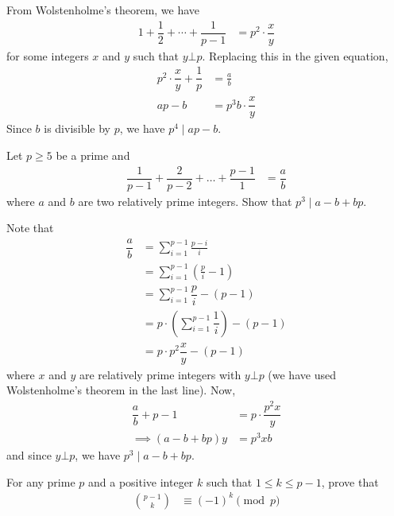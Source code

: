 \documentclass[12pt]{subfile}
\begin{document}
		\begin{solution}
			From Wolstenholme's theorem, we have
				\begin{align*}
					1 + \dfrac{1}{2} + \cdots + \dfrac{1}{p-1}
						& = p^2 \cdot \dfrac{x}{y}
				\end{align*}
			for some integers $x$ and $y$ such that $y \bot p$. Replacing this in the given equation,
				\begin{align*}
					p^2 \cdot \dfrac{x}{y}+ \dfrac{1}{p}
						& = \frac{a}{b}\\
					ap-b
						& = p^3b \cdot \dfrac{x}{y}
				\end{align*}
			Since $b$ is divisible by $p$, we have $p^4\mid ap-b$.
		\end{solution}

		\begin{problem}
			Let $p \geq 5$ be a prime and
				\begin{align*}
					\dfrac{1}{p-1} + \dfrac{2}{p-2} + \ldots + \dfrac{p-1}{1}
						& =\dfrac{a}{b}
				\end{align*}
			where $a$ and $b$ are two relatively prime integers. Show that $p^3\mid a-b+bp$.
		\end{problem}

		\begin{solution}
			Note that
				\begin{align*}
					\dfrac{a}{b}
						& = \sum_{i=1}^{p-1} \frac{p-i}{i}\\
						& =\sum_{i=1}^{p-1} \left(\frac{p}{i} -1 \right)\\
						& =\sum_{i=1}^{p-1} \dfrac{p}{i} - (p-1)\\
						& = p\cdot\left(\sum_{i=1}^{p-1} \dfrac{1}{i}\right)-(p-1)\\
						& = p \cdot p^2 \dfrac{x}{y}-(p-1)
				\end{align*}
			where $x$ and $y$ are relatively prime integers with $y \bot p$ (we have used Wolstenholme's theorem in the last line). Now,
				\begin{align*}
					\dfrac a b+p-1
						& =p\cdot\dfrac{p^2x}y\\
					\implies (a-b+bp)y
						& =p^3xb
				\end{align*}
			and since $y\bot p$, we have $p^3\mid a-b+bp$.
		\end{solution}



		\begin{problem}\label{prob:binom(p-1)(k)}
			For any prime $p$ and a positive integer $k$ such that $1 \leq k \leq p-1$, prove that
				\begin{align*}
					\binom{p-1}{k} & \equiv(-1)^k\pmod p
				\end{align*}
		\end{problem}
\end{document}
